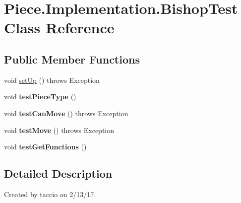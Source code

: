 \hypertarget{classPiece_1_1Implementation_1_1BishopTest}{\section{Piece.\-Implementation.\-Bishop\-Test Class Reference}
\label{classPiece_1_1Implementation_1_1BishopTest}
}
\subsection*{Public Member Functions}
\begin{DoxyCompactItemize}
\item 
void \hyperlink{classPiece_1_1Implementation_1_1BishopTest_afde1aba404e41da9eb303cf2d2975b5f}{set\-Up} ()  throws Exception 
\item 
\hypertarget{classPiece_1_1Implementation_1_1BishopTest_a19d4ab0e8c7d1ef95a20b649017c578d}{void {\bfseries test\-Piece\-Type} ()}\label{classPiece_1_1Implementation_1_1BishopTest_a19d4ab0e8c7d1ef95a20b649017c578d}

\item 
\hypertarget{classPiece_1_1Implementation_1_1BishopTest_ad78bf35582e6089377a8bb6e6974f078}{void {\bfseries test\-Can\-Move} ()  throws Exception}\label{classPiece_1_1Implementation_1_1BishopTest_ad78bf35582e6089377a8bb6e6974f078}

\item 
\hypertarget{classPiece_1_1Implementation_1_1BishopTest_a6e757167fdab7c92e7195aa7ce6c66aa}{void {\bfseries test\-Move} ()  throws Exception}\label{classPiece_1_1Implementation_1_1BishopTest_a6e757167fdab7c92e7195aa7ce6c66aa}

\item 
\hypertarget{classPiece_1_1Implementation_1_1BishopTest_a213353459419a6c78134e5205b3010f7}{void {\bfseries test\-Get\-Functions} ()}\label{classPiece_1_1Implementation_1_1BishopTest_a213353459419a6c78134e5205b3010f7}

\end{DoxyCompactItemize}


\subsection{Detailed Description}
Created by taccio on 2/13/17. 

